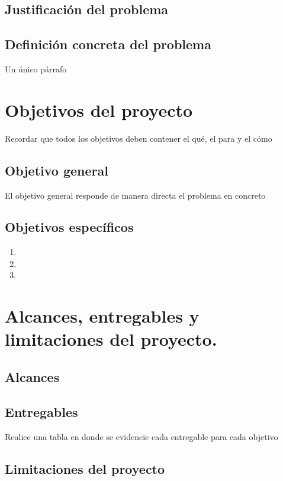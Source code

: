  

\subsection{Justificación del problema}



\subsection{Definición concreta del problema}
Un único párrafo


\section{Objetivos del proyecto}
Recordar que todos los objetivos deben contener el qué, el para y el cómo


\subsection{Objetivo general}
El objetivo general responde de manera directa el problema en concreto

\subsection{Objetivos específicos}

\begin{enumerate}
    \item 
    \item 
    \item 
\end{enumerate}

\section{Alcances, entregables y limitaciones del proyecto.}


\subsection{Alcances}


\subsection{Entregables}
Realice una tabla en donde se evidencie cada entregable para cada objetivo


\subsection{Limitaciones del proyecto}



